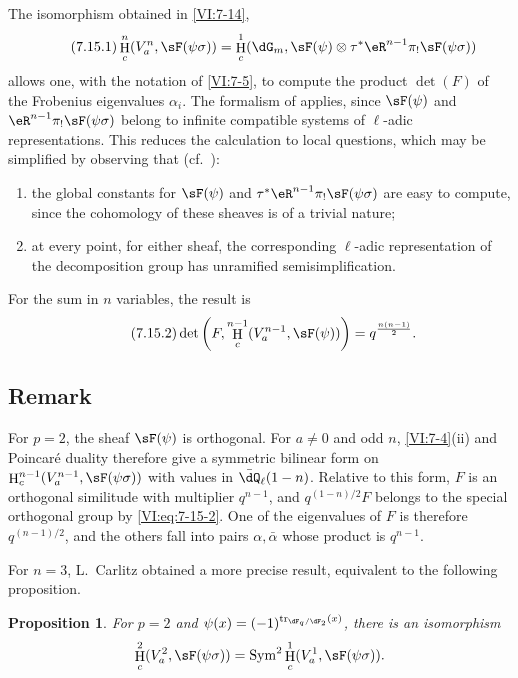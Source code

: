 \documentclass[12pt,oneside,english]{smfbook}
\DeclareMathOperator{\h}{H}
\DeclareMathOperator{\tr}{tr}
\newtheorem{proposition_}[subsection]{Proposition}
\begin{document}
The isomorphism obtained in \ref{VI:7-14},
\begin{equation*}\tag{7.15.1}\label{VI:eq:7-15-1}
  \h_c^n(V_a^n,\sF(\psi\sigma)) = \h_c^1(\dG_m,\sF(\psi)\otimes \tau^\ast \eR^{n-1} \pi_! \sF(\psi\sigma))
\end{equation*}
allows one, with the notation of \ref{VI:7-5}, to compute the product $\det(F)$ of the Frobenius eigenvalues $\alpha_i$. The formalism of \cite{de73} applies, since $\sF(\psi)$ and $\eR^{n-1}\pi_!\sF(\psi\sigma)$ belong to infinite compatible systems of $\ell$-adic representations. This reduces the calculation to local questions, which may be simplified by observing that (cf.\ \cite[9.5]{de73}):
\begin{enumerate}[\indent a)]
  \item the global constants for $\sF(\psi)$ and $\tau^\ast\eR^{n-1}\pi_!\sF(\psi\sigma)$ are easy to compute, since the cohomology of these sheaves is of a trivial nature;
  \item at every point, for either sheaf, the corresponding $\ell$-adic representation of the decomposition group has unramified semisimplification.
\end{enumerate}

For the sum in $n$ variables, the result is
\begin{equation*}\tag{7.15.2}\label{VI:eq:7-15-2}
  \det\left(F,\h_c^{n-1}(V_a^{n-1},\sF(\psi))\right) = q^{\frac{n(n-1)}{2}} \text{.}
\end{equation*}

\subsection{Remark}\label{VI:7-16}

For $p=2$, the sheaf $\sF(\psi)$ is orthogonal. For $a\ne0$ and odd $n$, \ref{VI:7-4}(ii) and Poincaré duality therefore give a symmetric bilinear form on $\h_c^{n-1}(V_a^{n-1},\sF(\psi\sigma))$ with values in $\bar\dQ_\ell(1-n)$. Relative to this form, $F$ is an orthogonal similitude with multiplier $q^{n-1}$, and $q^{(1-n)/2}F$ belongs to the special orthogonal group by \eqref{VI:eq:7-15-2}. One of the eigenvalues of $F$ is therefore $q^{(n-1)/2}$, and the others fall into pairs $\alpha,\bar\alpha$ whose product is $q^{n-1}$.

For $n=3$, L.\ Carlitz \cite{ca69-2} obtained a more precise result, equivalent to the following proposition.

\begin{proposition_}\label{VI:7-17}
For $p=2$ and $\psi(x)=(-1)^{\tr_{\dF_q/\dF_2}(x)}$, there is an isomorphism
\[
  \h_c^2(V_a^2,\sF(\psi\sigma)) = \operatorname{Sym}^2 \h_c^1(V_a^1,\sF(\psi\sigma)) \text{.}
\]
\end{proposition_}
\end{document}
